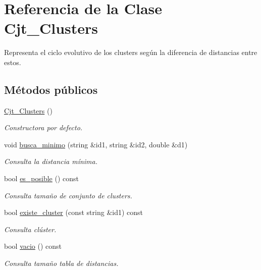\hypertarget{class_cjt___clusters}{}\section{Referencia de la Clase Cjt\+\_\+\+Clusters}
\label{class_cjt___clusters}


Representa el ciclo evolutivo de los clusters según la diferencia de distancias entre estos.  


\subsection*{Métodos públicos}
\begin{DoxyCompactItemize}
\item 
\hyperlink{class_cjt___clusters_a2e55759944a78043744103e19dd87c1c}{Cjt\+\_\+\+Clusters} ()
\begin{DoxyCompactList}\small\item\em Constructora por defecto. \end{DoxyCompactList}\item 
void \hyperlink{class_cjt___clusters_afc180c4e851b321837f6d2c173916e57}{busca\+\_\+minimo} (string \&id1, string \&id2, double \&d1)
\begin{DoxyCompactList}\small\item\em Consulta la distancia mínima. \end{DoxyCompactList}\item 
bool \hyperlink{class_cjt___clusters_adf61aa25dfe16d52c5453d048df5efff}{es\+\_\+posible} () const
\begin{DoxyCompactList}\small\item\em Consulta tamaño de conjunto de clusters. \end{DoxyCompactList}\item 
bool \hyperlink{class_cjt___clusters_a989a4f3092a2bd47dc9a855107aa5086}{existe\+\_\+cluster} (const string \&id1) const
\begin{DoxyCompactList}\small\item\em Consulta clúster. \end{DoxyCompactList}\item 
bool \hyperlink{class_cjt___clusters_aeeea0be1e59431ef029fb42ce1aaddc6}{vacio} () const
\begin{DoxyCompactList}\small\item\em Consulta tamaño tabla de distancias. \end{DoxyCompactList}\item 

\end{DoxyCompactItemize}
